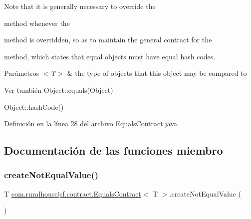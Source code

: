 Note that it is generally necessary to override the
\begin{DoxyCode}{0}
\end{DoxyCode}
 method whenever the
\begin{DoxyCode}{0}
\end{DoxyCode}
 method is overridden, so as to maintain the general contract for the
\begin{DoxyCode}{0}
\end{DoxyCode}
 method, which states that equal objects must have equal hash codes.


\begin{DoxyParams}{Parámetros}
{\em $<$\+T$>$} & the type of objects that this object may be compared to\\
\hline
\end{DoxyParams}
\begin{DoxySeeAlso}{Ver también}
Object\+::equals(\+Object) 

Object\+::hash\+Code() 
\end{DoxySeeAlso}


Definición en la línea 28 del archivo Equals\+Contract.\+java.



\subsection{Documentación de las funciones miembro}
\mbox{\label{interfacecom_1_1ruralhousejsf_1_1contract_1_1_equals_contract_a65840509b57f6b89e42e2abf1978aa01}} 
\subsubsection{\texorpdfstring{createNotEqualValue()}{createNotEqualValue()}}
{\footnotesize\ttfamily T \mbox{\hyperlink{interfacecom_1_1ruralhousejsf_1_1contract_1_1_equals_contract}{com.\+ruralhousejsf.\+contract.\+Equals\+Contract}}$<$ T $>$.create\+Not\+Equal\+Value (\begin{DoxyParamCaption}{ }\end{DoxyParamCaption})}

